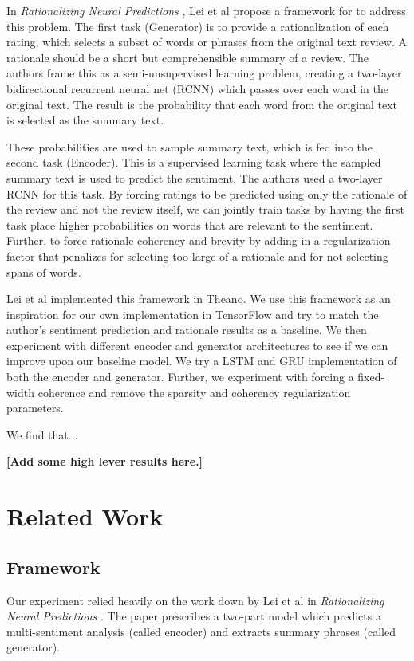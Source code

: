\documentclass{article} %
\begin{document}
In \textit{Rationalizing Neural Predictions} \cite{Lei}, Lei et al propose a
framework for to address this problem. The first task (Generator) is to provide
a rationalization of each rating, which selects a subset of words or phrases
from the original text review. A rationale should be a short but comprehensible
summary of a review. The authors frame this as a semi-unsupervised learning
problem, creating a two-layer bidirectional recurrent neural net (RCNN) which
passes over each word in the original text. The result is the probability that
each word from the original text is selected as the summary text.

These probabilities are used to sample summary text, which is fed into the
second task (Encoder). This is a supervised learning task where the sampled
summary text is used to predict the sentiment. The authors used a two-layer RCNN
for this task. By forcing ratings to be predicted using only the rationale of
the review and not the review itself, we can jointly train tasks by having the
first task place higher probabilities on words that are relevant to the
sentiment. Further, to force rationale coherency and brevity by adding in a
regularization factor that penalizes for selecting too large of a rationale and
for not selecting spans of words.

Lei et al implemented this framework in Theano. We use this framework as an
inspiration for our own implementation in TensorFlow and try to match the
author's sentiment prediction and rationale results as a baseline. We then
experiment with different encoder and generator architectures to see if we can
improve upon our baseline model. We try a LSTM and GRU implementation of both
the encoder and generator. Further, we experiment with forcing a fixed-width
coherence and remove the sparsity and coherency regularization parameters.

We find that...

\textbf{[Add some high lever results here.]}

\section{Related Work}

\subsection{Framework}

Our experiment relied heavily on the work down by Lei et al in
\textit{Rationalizing Neural Predictions} \cite{Lei}. The paper prescribes a
two-part model which predicts a multi-sentiment analysis (called encoder) and
extracts summary phrases (called generator).
\end{document}
